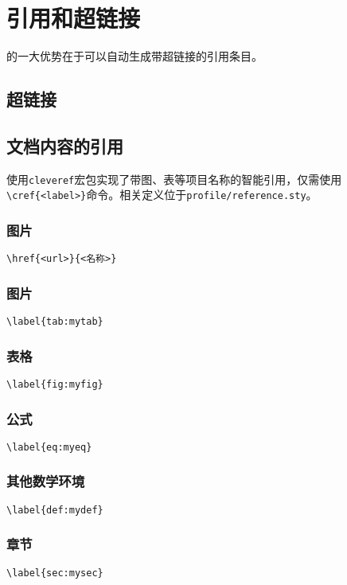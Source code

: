 \chapter{引用和超链接}
\label{chap:reference}

的一大优势在于可以自动生成带超链接的引用条目。

\section{超链接}
\section{文档内容的引用}

使用\lstinline|cleveref|宏包实现了带图、表等项目名称的智能引用，仅需使用\lstinline|\cref{<label>}|命令。相关定义位于\lstinline|profile/reference.sty|。

\subsection{图片}

\lstinline|\href{<url>}{<名称>}|

\subsection{图片}

\lstinline|\label{tab:mytab}|

\subsection{表格}

\lstinline|\label{fig:myfig}|

\subsection{公式}

\lstinline|\label{eq:myeq}|


\subsection{其他数学环境}

\lstinline|\label{def:mydef}|

\subsection{章节}


\lstinline|\label{sec:mysec}|
